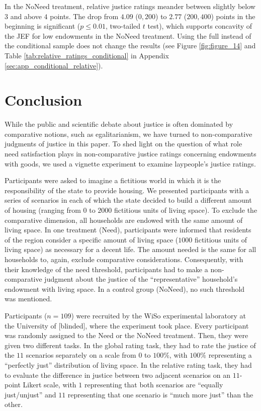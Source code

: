 \documentclass[12pt]{scrartcl}
\begin{document}
In the NoNeed treatment, relative justice ratings meander between slightly below $3$ and above $4$ points.
The drop from $4.09$ ($0,200$) to $2.77$ ($200,400$) points in the beginning is significant ($p\le 0.01$, two-tailed $t$ test), which supports concavity of the JEF for low endowments in the NoNeed treatment.
Using the full instead of the conditional sample does not change the results (see Figure \ref{fig:figure_14} and Table \ref{tab:relative_ratings_conditional} in Appendix \ref{sec:app_conditional_relative}).


\section{Conclusion}\label{sec:conclusion}
While the public and scientific debate about justice is often dominated by comparative notions, such as egalitarianism, we have turned to non-comparative judgments of justice in this paper.
To shed light on the question of what role need satisfaction plays in non-comparative justice ratings concerning endowments with goods, we used a vignette experiment to examine laypeople's justice ratings.

Participants were asked to imagine a fictitious world in which it is the responsibility of the state to provide housing.
We presented participants with a series of scenarios in each of which the state decided to build a different amount of housing (ranging from $0$ to $2000$ fictitious units of living space).
To exclude the comparative dimension, all households are endowed with the same amount of living space.
In one treatment (Need), participants were informed that residents of the region consider a specific amount of living space ($1000$ fictitious units of living space) as necessary for a decent life.
The amount needed is the same for all households to, again, exclude comparative considerations.
Consequently, with their knowledge of the need threshold, participants had to make a non-comparative judgment about the justice of the ``representative'' household's endowment with living space.
In a control group (NoNeed), no such threshold was mentioned.

Participants ($n=109$) were recruited by the WiSo experimental laboratory at the University of [blinded], where the experiment took place.
Every participant was randomly assigned to the Need or the NoNeed treatment.
Then, they were given two different tasks.
In the global rating task, they had to rate the justice of the $11$ scenarios separately on a scale from $0$ to $100\%$, with $100\%$ representing a ``perfectly just'' distribution of living space.
In the relative rating task, they had to evaluate the difference in justice between two adjacent scenarios on an $11$-point Likert scale, with $1$ representing that both scenarios are ``equally just/unjust'' and $11$ representing that one scenario is ``much more just'' than the other.
\end{document}
